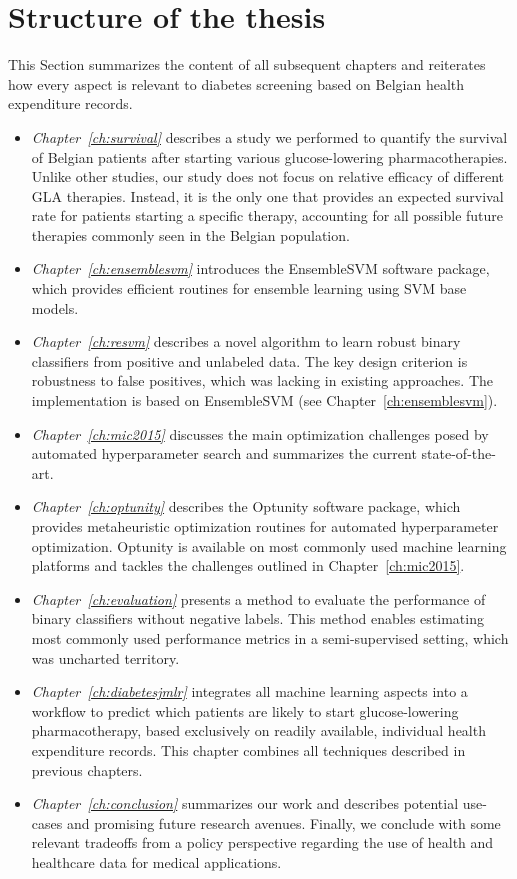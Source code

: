 \section{Structure of the thesis} \label{intro:structure}
This Section summarizes the content of all subsequent chapters  and reiterates how every aspect is relevant to diabetes screening based on Belgian health expenditure records.

\newcommand{\chapteritem}[2]{\item \emph{Chapter~\ref{ch:#1}} #2}
\begin{itemize}

\chapteritem{survival} describes a study we performed to quantify the survival of Belgian patients after starting various glucose-lowering pharmacotherapies. Unlike other studies, our study does not focus on relative efficacy of different GLA therapies. Instead, it is the only one that provides an expected survival rate for patients starting a specific therapy, accounting for all possible future therapies commonly seen in the Belgian population.

\chapteritem{ensemblesvm}{introduces the EnsembleSVM software package, which provides efficient routines for ensemble learning using SVM base models.}

\chapteritem{resvm}{describes a novel algorithm to learn robust binary classifiers from positive and unlabeled data. The key design criterion is robustness to false positives, which was lacking in existing approaches. The implementation is based on EnsembleSVM (see Chapter~\ref{ch:ensemblesvm}).}

\chapteritem{mic2015}{discusses the main optimization challenges posed by automated hyperparameter search and summarizes the current state-of-the-art.}

\chapteritem{optunity}{describes the Optunity software package, which provides metaheuristic optimization routines for automated hyperparameter optimization. Optunity is available on most commonly used machine learning platforms and tackles the challenges outlined in Chapter~\ref{ch:mic2015}.}

\chapteritem{evaluation}{presents a method to evaluate the performance of binary classifiers without negative labels. This method enables estimating most commonly used performance metrics in a semi-supervised setting, which was uncharted territory.}

\chapteritem{diabetesjmlr}{integrates all machine learning aspects into a workflow to predict which patients are likely to start glucose-lowering pharmacotherapy, based exclusively on readily available, individual health expenditure records. This chapter combines all techniques described in previous chapters.}

\chapteritem{conclusion}{summarizes our work and describes potential use-cases and promising future research avenues. Finally, we conclude with some relevant tradeoffs from a policy perspective regarding the use of health and healthcare data for medical applications.}

\end{itemize}
